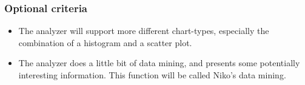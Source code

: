 \subsubsection{Optional criteria}
\begin{itemize}
\item The analyzer will support more different chart-types, especially the combination of
a histogram and a scatter plot. 
\item The analyzer does a little bit of data mining, and presents some potentially interesting information.
This function will be called Niko's data mining.
\end{itemize}






